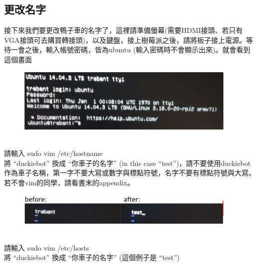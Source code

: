 \documentclass{article}
\begin{document}
\subsection{更改名字}
接下來我們要更改鴨子車的名字了，這裡請準備螢幕(需要HDMI接頭、若只有VGA接頭可去購買轉接頭)，以及鍵盤，接上樹莓派之後，請將板子接上電源。等待一會之後，輸入帳號密碼，皆為ubuntu (輸入密碼時不會顯示出來)。就會看到這個畫面
\\
\begin{figure}[htp]
    \begin{center}
        \includegraphics[width=300pt]{pic/1_3_1.png}
    \end{center}
\end{figure}
\\
請輸入 sudo vim /etc/hostname
\\將 “duckiebot” 換成 “你車子的名字” (in this case “test”)，請不要使用duckiebot作為車子名稱，第一字不要大寫或數字與標點符號，名字不要有標點符號與大寫。若不會vim的同學，請看書末的appendix。
\\
\begin{figure}[htp]
    \begin{center}
        \includegraphics[width=300pt]{pic/1_3_2.png}
    \end{center}
\end{figure}
\\
請輸入 sudo vim /etc/hosts
\\將 “duckiebot” 換成 “你車子的名字” (這個例子是 “test”)
\\\\\\\\\\\\\\\\\\\\\\\\\\
\end{document}
